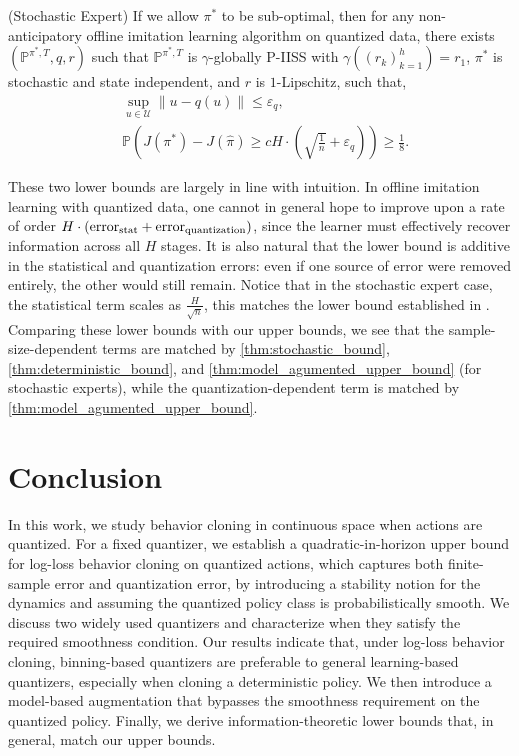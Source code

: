 \documentclass{article}
\begin{document}
\begin{theorem}\label{thm:lb_stochastic_expert}\textnormal{(Stochastic Expert)}
    If we allow $\pi^*$ to be sub-optimal, then for any non-anticipatory offline imitation learning algorithm on quantized data, there exists $(\mathbb P^{\pi^*, T}, q, r)$ such that $\mathbb P^{\pi^*,T}$ is $\gamma$-globally P-IISS with $\gamma((r_k)_{k=1}^h)=r_1$, $\pi^*$ is stochastic and state independent, and $r$ is $1$-Lipschitz, such that,
    \begin{align*}
    &\sup_{u\in\mathcal U} \|u-q(u)\| \leq \varepsilon_q, \\
        &\mathbb P\left(J(\pi^*)-J(\hat \pi)\geq cH\cdot(\sqrt{\frac{1}{n}}+\varepsilon_q) \right)\geq \frac{1}{8}.
    \end{align*}
\end{theorem}


These two lower bounds are largely in line with intuition. In offline imitation learning with quantized data, one cannot in general hope to improve upon a rate of order
$H\cdot (\textnormal{error}_{\textnormal{stat}}+\textnormal{error}_{\textnormal{quantization}})$, since the learner must effectively recover information across all $H$ stages. It is also natural that the lower bound is additive in the statistical and quantization errors: even if one source of error were removed entirely, the other would still remain. Notice that in the stochastic expert case, the statistical term scales as $\frac{H}{\sqrt{n}}$, this matches the lower bound established in \citet{foster2024behavior}. Comparing these lower bounds with our upper bounds, we see that the sample-size-dependent terms are matched by \cref{thm:stochastic_bound}, \cref{thm:deterministic_bound}, and \cref{thm:model_agumented_upper_bound} (for stochastic experts), while the quantization-dependent term is matched by \cref{thm:model_agumented_upper_bound}.




\section{Conclusion}
In this work, we study behavior cloning in continuous space when actions are quantized. For a fixed quantizer, we establish a quadratic-in-horizon upper bound for log-loss behavior cloning on quantized actions, which captures both finite-sample error and quantization error, by introducing a stability notion for the dynamics and assuming the quantized policy class is probabilistically smooth. We discuss two widely used quantizers and characterize when they satisfy the required smoothness condition. Our results indicate that, under log-loss behavior cloning, binning-based quantizers are preferable to general learning-based quantizers, especially when cloning a deterministic policy. We then introduce a model-based augmentation that bypasses the smoothness requirement on the quantized policy. Finally, we derive information-theoretic lower bounds that, in general, match our upper bounds.
\end{document}
